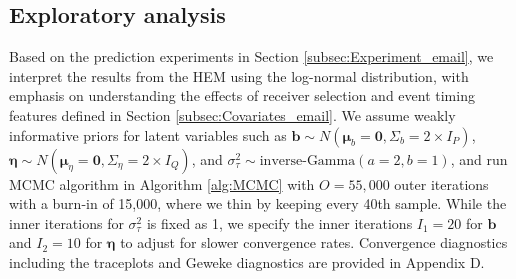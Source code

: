 \documentclass[ba]{imsart}
\numberwithin{equation}{section}
\theoremstyle{plain}
\begin{document}
	\subsection{Exploratory analysis}\label{subsec:Result_email}
	Based on the prediction experiments in Section \ref{subsec:Experiment_email}, we interpret the results from the HEM using the log-normal distribution, with emphasis on understanding the effects of receiver selection and event timing features defined in Section \ref{subsec:Covariates_email}. We assume weakly informative priors for latent variables such as $\boldsymbol{b}\sim N(\boldsymbol{\mu}_b=\boldsymbol{0}, \Sigma_b = 2\times I_P)$, $\boldsymbol{\eta}\sim N(\boldsymbol{\mu}_\eta=\boldsymbol{0}, \Sigma_\eta = 2\times I_Q)$, and $\sigma_\tau^2 \sim \mbox{inverse-Gamma}(a=2, b=1)$, and run MCMC algorithm in Algorithm \ref{alg:MCMC} with $O=55,000$ outer iterations with a burn-in of 15,000, where we thin by keeping every 40th sample. While the inner iterations for $\sigma_\tau^2$ is fixed as 1, we specify the inner iterations $I_1=20$ for $\boldsymbol{b}$ and $I_2=10$ for $\boldsymbol{\eta}$ to adjust for slower convergence rates. Convergence diagnostics including the traceplots and Geweke diagnostics \citep{geweke1991evaluating} are provided in Appendix D.
	
\end{document}
